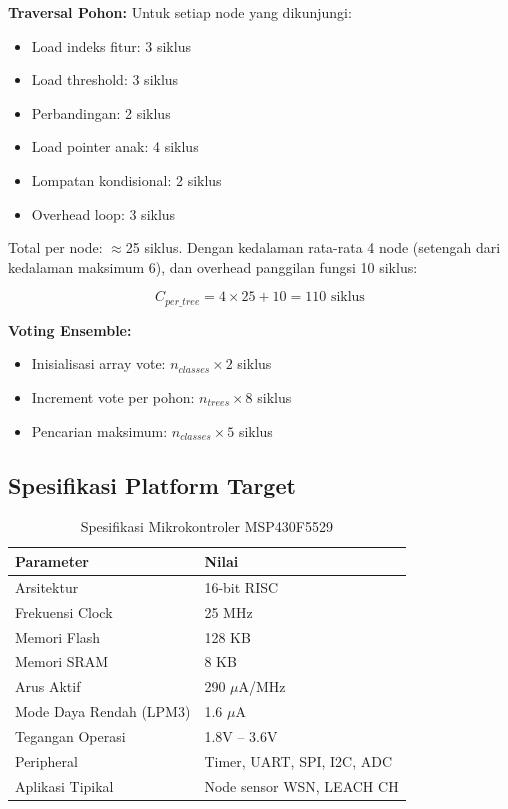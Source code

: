 \textbf{Traversal Pohon:}
Untuk setiap node yang dikunjungi:
\begin{itemize}
    \item Load indeks fitur: 3 siklus
    \item Load threshold: 3 siklus
    \item Perbandingan: 2 siklus
    \item Load pointer anak: 4 siklus
    \item Lompatan kondisional: 2 siklus
    \item Overhead loop: 3 siklus
\end{itemize}

Total per node: $\approx$25 siklus. Dengan kedalaman rata-rata 4 node (setengah dari kedalaman maksimum 6), dan overhead panggilan fungsi 10 siklus:

\begin{equation}
    C_{per\_tree} = 4 \times 25 + 10 = 110 \text{ siklus}
\end{equation}

\textbf{Voting Ensemble:}
\begin{itemize}
    \item Inisialisasi array vote: $n_{classes} \times 2$ siklus
    \item Increment vote per pohon: $n_{trees} \times 8$ siklus
    \item Pencarian maksimum: $n_{classes} \times 5$ siklus
\end{itemize}

\subsection{Spesifikasi Platform Target}

\begin{table}[htbp]
\centering
\caption{Spesifikasi Mikrokontroler MSP430F5529}
\label{tab:msp430_specs_id}
\begin{tabular}{ll}
\hline
\textbf{Parameter} & \textbf{Nilai} \\
\hline
Arsitektur & 16-bit RISC \\
Frekuensi Clock & 25 MHz \\
Memori Flash & 128 KB \\
Memori SRAM & 8 KB \\
Arus Aktif & 290 $\mu$A/MHz \\
Mode Daya Rendah (LPM3) & 1.6 $\mu$A \\
Tegangan Operasi & 1.8V -- 3.6V \\
Peripheral & Timer, UART, SPI, I2C, ADC \\
Aplikasi Tipikal & Node sensor WSN, LEACH CH \\
\hline
\end{tabular}
\end{table}

